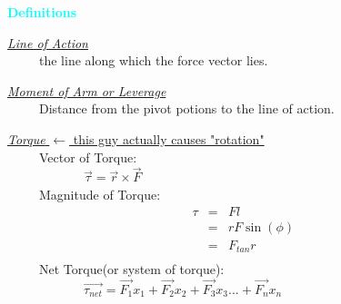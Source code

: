 \documentclass[12pt,letterpaper,fleqn]{article}
\begin{document}
\begin{flushleft}
\textcolor{cyan}{\large\bf Definitions} 
\end{flushleft}
\begin{flushleft}

\underline{\large\it Line of Action}\\ 
\ \ \ \ \ the line along which the force vector lies.

\underline{\large\it Moment of Arm or Leverage}\\
\ \ \ \ \ Distance from the pivot potions to the line of action.


\underline{{\large\it Torque} \tiny$\leftarrow$  this guy actually causes "rotation"}\\
\ \ \ \ \ Vector of Torque:
\\ \ \ \ \ \ \ \ \ \ \ \ \ $\vec{\tau} = \vec{r}\times\vec{F}$\\
\ \ \ \ \ Magnitude of Torque: 
\begin{eqnarray*}
\ \ \ \ \  \tau &=& Fl  \nonumber \\
&=& rF\sin(\phi) \nonumber \\
&=& F_{tan}r \nonumber \\
\end{eqnarray*} 
\ \ \ \ \ Net Torque(or system of torque):
\\ \ \ \ \ \ \ \ \ \ \ \ \ $\vec{\tau_{net}} = \vec{F_1}x_1+\vec{F_2}x_2+\vec{F_3}x_3...+\vec{F_n}x_n $

\end{flushleft}






\end{document}

